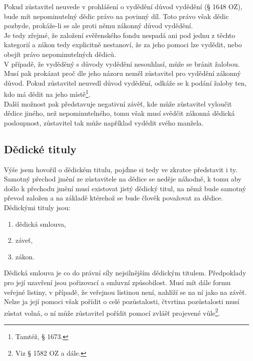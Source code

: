 \documentclass{article}
\begin{document}
Pokud zůstavitel neuvede v prohlášení o vydědění důvod vydědění (§ 1648 OZ), bude mít nepominutelný dědic právo na povinný díl. Toto právo však dědic pozbyde, prokáže-li se ale proti němu zákonný důvod vydědění.\\

Je tedy zřejmé, že založení svěřenského fondu nespadá ani pod jednu z těchto kategorií a zákon tedy explicitně nestanoví, že za jeho pomoci lze vydědit, nebo obejít právo nepominutelných dědiců.\\

V případě, že vyděděný s důvody vydědění nesouhlasí, může se bránit žalobou. Musí pak prokázat proč dle jeho názoru neměl zůstavitel pro vydědění zákonný důvod. Pokud zůstavitel neuvedl důvod vydědění, odkáže se k podání žaloby ten, kdo má dědit na jeho místě\footnote{Tamtéž, § 1673.}.\\

Další možnost pak představuje negativní závěť, kde může zůstavitel vyloučit dědice jiného, než nepominutelného, tomu však musí svědčit zákonná dědická posloupnost, zůstavitel tak může například vydědit svého manžela.

\subsection{Dědické tituly}

Výše jsem hovořil o dědickém titulu, pojďme si tedy ve zkratce představit i ty. \\

Samotný přechod jmění ze zůstavitele na dědice se neděje náhodně, k tomu aby došlo k přechodu jmění musí existovat jistý dědický titul, na němž bude samotný převod založen a na základě ktérehož se bude člověk považovat za dědice.\\

Dědickými tituly jsou:

\begin{enumerate}
\item dědická smlouva,
\item záveť,
\item zákon.	
\end{enumerate}

Dědická smlouva je co do právní síly nejsilnějším dědickým titulem. Předpoklady pro její uzavření jsou pořizovací a smluvní způsobilost. Musí mít dále formu veřejné listiny, v případě, že veřejnou listinou není, nahlíží se na ní jako na závěť. Nelze ja její pomoci však pořídit o celé pozůstalosti, čtvrtina pozůstalosti musí zůstat volná, o ní může zůstavitel pořídit pomocí zvlášť projevené vůle\footnote{Viz § 1582 OZ a dále.}.\\
\end{document}
